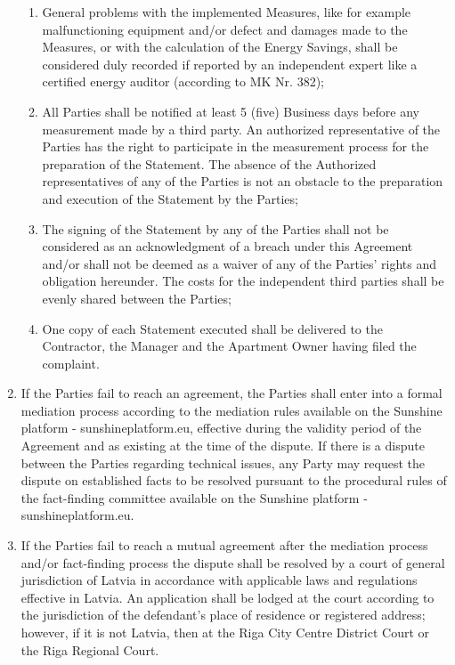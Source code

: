 \begin{multicols}{2}
\begin{enumerate}
\begin{enumerate}
		\item	General problems with the implemented Measures, like for example malfunctioning equipment and/or defect and damages made to the Measures, or with the calculation of the Energy Savings, shall be considered duly recorded if reported by an independent expert like a certified energy auditor (according to MK Nr. 382);
		\item	All Parties shall be notified at least 5 (five) Business days before any measurement made by a third party. An authorized representative of the Parties has the right to participate in the measurement process for the preparation of the Statement. The absence of the Authorized representatives of any of the Parties is not an obstacle to the preparation and execution of the Statement by the Parties;
		\item	The signing of the Statement by any of the Parties shall not be considered as an acknowledgment of a breach under this Agreement and/or shall not be deemed as a waiver of any of the Parties’ rights and obligation hereunder. The costs for the independent third parties shall be evenly shared between the Parties;
		\item	One copy of each Statement executed shall be delivered to the Contractor, the Manager and the Apartment Owner having filed the complaint.
	\end{enumerate}
	\item	If the Parties fail to reach an agreement, the Parties shall enter into a formal mediation process according to the mediation rules available on the Sunshine platform - sunshineplatform.eu, effective during the validity period of the Agreement and as existing at the time of the dispute. If there is a dispute between the Parties regarding technical issues, any Party may request the dispute on established facts to be resolved pursuant to the procedural rules of the fact-finding committee available on the Sunshine platform - sunshineplatform.eu.
	\item	If the Parties fail to reach a mutual agreement after the mediation process and/or fact-finding process the dispute shall be resolved by a court of general jurisdiction of Latvia in accordance with applicable laws and regulations effective in Latvia. An application shall be lodged at the court according to the jurisdiction of the defendant’s place of residence or registered address; however, if it is not Latvia, then at the Riga City Centre District Court or the Riga Regional Court.
\end{enumerate}


\end{multicols}
